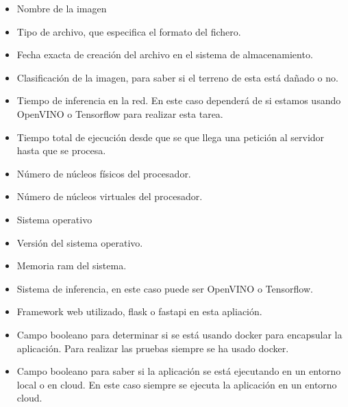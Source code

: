 \begin{itemize}
    \item Nombre de la imagen
    \item Tipo de archivo, que especifica el formato del fichero.
    \item Fecha exacta de creación del archivo en el sistema de almacenamiento.
    \item Clasificación de la imagen, para saber si el terreno de esta está dañado o no.
    \item Tiempo de inferencia en la red.
    En este caso dependerá de si estamos usando OpenVINO o Tensorflow para realizar esta tarea.
    \item Tiempo total de ejecución desde que se que llega una petición al servidor hasta que se procesa.
    \item Número de núcleos físicos del procesador.
    \item Número de núcleos virtuales del procesador.
    \item Sistema operativo
    \item Versión del sistema operativo.
    \item Memoria ram del sistema.
    \item Sistema de inferencia, en este caso puede ser OpenVINO o Tensorflow.
    \item Framework web utilizado, flask o fastapi en esta apliación.
    \item Campo booleano para determinar si se está usando docker para encapsular la aplicación.
    Para realizar las pruebas siempre se ha usado docker.
    \item Campo booleano para saber si la aplicación se está ejecutando en un entorno local o en cloud.
    En este caso siempre se ejecuta la aplicación en un entorno cloud.
\end{itemize}


